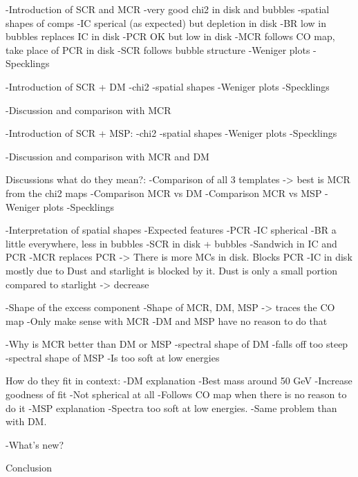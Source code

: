 	
	-Introduction of SCR and MCR
		-very good chi2 in disk and bubbles
		-spatial shapes of comps
			-IC sperical (as expected) but depletion in disk
			-BR low in bubbles replaces IC in disk
			-PCR OK but low in disk
			-MCR follows CO map, take place of PCR in disk
			-SCR follows bubble structure
		-Weniger plots
		-Specklings

	-Introduction of SCR + DM
		-chi2
		-spatial shapes	
		-Weniger plots
		-Specklings
		
		-Discussion and comparison with MCR

	-Introduction of SCR + MSP:
		-chi2
		-spatial shapes
		-Weniger plots
		-Specklings
		
		-Discussion and comparison with MCR and DM

Discussions what do they mean?:
	-Comparison of all 3 templates -> best is MCR from the chi2 maps
		-Comparison MCR vs DM
		-Comparison MCR vs MSP
		-Weniger plots
		-Specklings
	
	-Interpretation of spatial shapes
		-Expected features
			-PCR			
			-IC spherical
			-BR a little everywhere, less in bubbles			
			-SCR in disk + bubbles
		-Sandwich in IC and PCR
			-MCR replaces PCR -> There is more MCs in disk. Blocks PCR
			-IC in disk mostly due to Dust and starlight is blocked by it. Dust is only a small portion compared to starlight -> decrease
		
		-Shape of the excess component		
			-Shape of MCR, DM, MSP -> traces the CO map
			-Only make sense with MCR
			-DM and MSP have no reason to do that

	
	-Why is MCR better than DM or MSP
		-spectral shape of DM
			-falls off too steep
		-spectral shape of MSP
			-Is too soft at low energies


How do they fit in context:
	-DM explanation
		-Best mass around 50 GeV
		-Increase goodness of fit
		-Not spherical at all
		-Follows CO map when there is no reason to do it
	-MSP explanation
		-Spectra too soft at low energies.
		-Same problem than with DM.
		
	-What's new?
		

Conclusion

